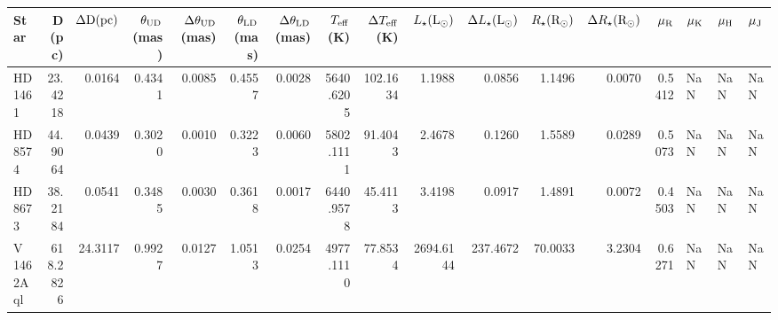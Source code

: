 \begin{tabular}{lrrrrrrrrrrrrrlll}
\toprule
Star & D (pc) & $\Delta \rm D (pc)$ & $\theta_{\rm UD}$ (mas) & $\Delta\theta_{\rm UD}$ (mas) & $\theta_{\rm LD}$ (mas) & $\Delta\theta_{\rm LD}$ (mas) & $T_{\rm eff}$ (K) & $\Delta T_{\rm eff}$ (K) & $L_{\star} (\rm L_{\odot})$ & $\Delta L_{\star} (\rm L_{\odot})$ & $R_{\star} (\rm R_{\odot})$ & $\Delta R_{\star} (\rm R_{\odot})$ & $\mu_{\rm R}$ & $\mu_{\rm K}$ & $\mu_{\rm H}$ & $\mu_{\rm J}$ \\
\midrule
HD 1461 & 23.4218 & 0.0164 & 0.4341 & 0.0085 & 0.4557 & 0.0028 & 5640.6205 & 102.1634 & 1.1988 & 0.0856 & 1.1496 & 0.0070 & 0.5412 & NaN & NaN & NaN \\
HD 8574 & 44.9064 & 0.0439 & 0.3020 & 0.0010 & 0.3223 & 0.0060 & 5802.1111 & 91.4043 & 2.4678 & 0.1260 & 1.5589 & 0.0289 & 0.5073 & NaN & NaN & NaN \\
HD 8673 & 38.2184 & 0.0541 & 0.3485 & 0.0030 & 0.3618 & 0.0017 & 6440.9578 & 45.4113 & 3.4198 & 0.0917 & 1.4891 & 0.0072 & 0.4503 & NaN & NaN & NaN \\
V 1462Aql & 618.2826 & 24.3117 & 0.9927 & 0.0127 & 1.0513 & 0.0254 & 4977.1110 & 77.8534 & 2694.6144 & 237.4672 & 70.0033 & 3.2304 & 0.6271 & NaN & NaN & NaN \\
\bottomrule
\end{tabular}
